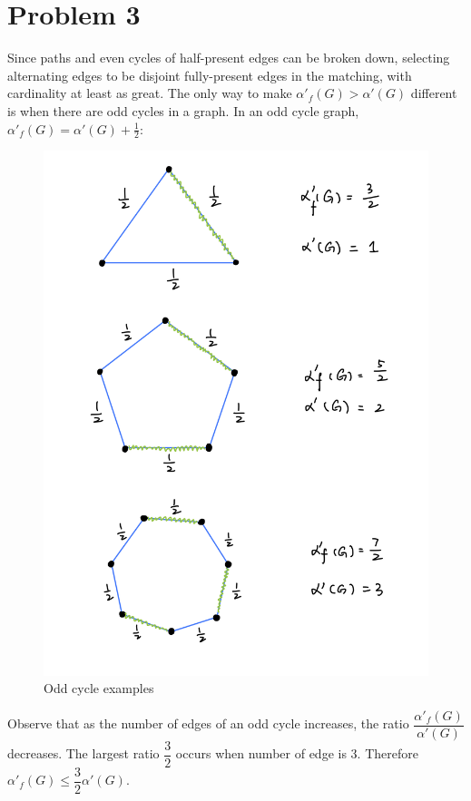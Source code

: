 \documentclass[a4paper]{article}
\begin{document}
	\section*{Problem 3}

	Since paths and even cycles of half-present edges can be broken down, selecting alternating edges to be disjoint fully-present edges in the matching, with cardinality at least as great. The only way to make $\alpha'_f(G) > \alpha'(G)$ different is when there are odd cycles in a graph. In an odd cycle graph, $\alpha'_f(G)=\alpha'(G)+\frac{1}{2}$:
	\begin{figure}[h]
        \centering
        \includegraphics[scale = 0.04]{images/a.png}
        \caption{Odd cycle examples}
    \end{figure}

	Observe that as the number of edges of an odd cycle increases, the ratio $\dfrac{\alpha'_f(G)}{\alpha'(G)}$ decreases. The largest ratio $\dfrac{3}{2}$ occurs when number of edge is 3. Therefore $\alpha'_f(G) \le \dfrac{3}{2}\alpha'(G)$.
\end{document}
